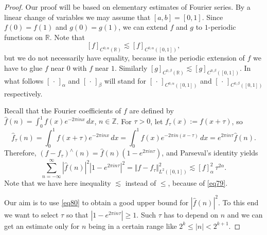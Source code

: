 \documentclass[intlimits,12pt,reqno]{amsart}
\newcommand{\R}{\mathbb R}
\newcommand{\Z}{\mathbb Z}
\numberwithin{equation}{section}
\theoremstyle{definition}
\begin{document}
\begin{proof}
Our proof will be based on elementary estimates of Fourier series.
By a linear change of variables we may assume that $[a,b]=[0,1]$.
Since $f(0)=f(1)$ and $g(0)=g(1)$, we can extend $f$ and $g$ to $1$-periodic functions on $\R$. Note that
\begin{equation}
\label{eq79}
[f]_{C^{0,\alpha}(\R)}\lesssim [f]_{C^{0,\alpha}([0,1])},
\end{equation}
but we do not necessarily have equality, because in the periodic extension of $f$ we have to glue $f$ near $0$ with $f$ near $1$. Similarly $[g]_{C^{0,\beta}(\R)}\lesssim [g]_{C^{0,\beta}([0,1])}$.
In what follows $[\,\cdot\,]_{\alpha}$ and $[\,\cdot\,]_{\beta}$ will stand for $[\,\cdot\,]_{C^{0,\alpha}([0,1])}$ and $[\,\cdot\,]_{C^{0,\beta}([0,1])}$ respectively.

Recall that the Fourier coefficients of $f$ are defined by
$\hat{f}(n)=\int_0^1f(x)e^{-2\pi inx}\, dx$, $n\in\Z$.
For $\tau>0$, let $f_\tau(x):=f(x+\tau)$, so
$$
\hat{f}_\tau(n)=\int_0^1f(x+\tau)e^{-2\pi inx}\, dx=
\int_0^1f(x)e^{-2\pi in(x-\tau)}\, dx=
e^{2\pi in\tau}\hat{f}(n).
$$
Therefore,
$(f-f_\tau)^\wedge(n)=
\hat{f}(n)(1-e^{2\pi in\tau})$,
and Parseval's identity yields
\begin{equation}
\label{eq80}
\sum_{n=-\infty}^\infty |\hat{f}(n)|^2|1-e^{2\pi in\tau}|^2=\Vert f-f_\tau\Vert^2_{L^2([0,1])}\lesssim [f]^2_{\alpha}\,\tau^{2\alpha}.
\end{equation}
Note that we have here inequality $\lesssim$ instead of $\leq$, because of \eqref{eq79}.

Our aim is to use \eqref{eq80} to obtain a good upper bound for $|\hat{f}(n)|^2$. To this end we want to select $\tau$ so that $|1-e^{2\pi in\tau}|\geq 1$. Such $\tau$ has to depend on $n$ and we can get an estimate only for $n$ being in a certain range like $2^k\leq |n|<2^{k+1}$.


\end{proof}
\end{document}
